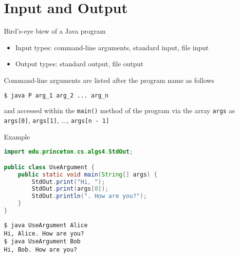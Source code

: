 \documentclass[8pt,a4paper,compress]{beamer}
\begin{document}
\section{Input and Output}
\begin{frame}[fragile]
\pause

Bird's-eye biew of a Java program
\begin{center}
\end{center}

\begin{itemize}
\item Input types: command-line arguments, standard input, file input
\item Output types: standard output, file output
\end{itemize}

\pause
\bigskip

Command-line arguments are listed after the program name as follows
\begin{lstlisting}[language=bash]
$ java P arg_1 arg_2 ... arg_n
\end{lstlisting}
and accessed within the \lstinline$main()$ method of the program via the array \lstinline$args$  as \lstinline$args[0]$, \lstinline$args[1]$, $\dots$, \lstinline$args[n - 1]$

\pause
\bigskip

Example
\begin{lstlisting}[language=Java]
import edu.princeton.cs.algs4.StdOut;

public class UseArgument {
    public static void main(String[] args) {
        StdOut.print("Hi, ");
        StdOut.print(args[0]);
        StdOut.println(". How are you?");
    }
}
\end{lstlisting}

\pause

\begin{lstlisting}[language={}]
$ java UseArgument Alice
Hi, Alice. How are you?
$ java UseArgument Bob
Hi, Bob. How are you?
\end{lstlisting}
\end{frame}
\end{document}
